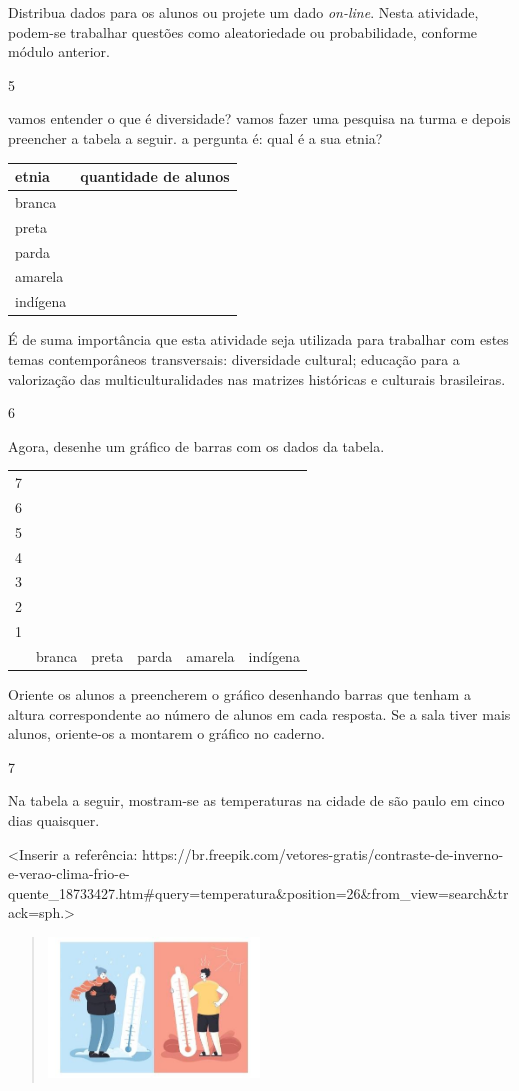 Distribua dados para os alunos ou projete um dado
\textit{on-line}. Nesta atividade, podem-se trabalhar questões como
aleatoriedade ou probabilidade, conforme módulo anterior.

\num{5}

vamos entender o que é diversidade? vamos fazer uma pesquisa na turma e
depois preencher a tabela a seguir. a pergunta é: qual é a sua etnia?

\begin{longtable}[]{@{}ll@{}}
\toprule
etnia & quantidade de alunos\tabularnewline
\midrule
\endhead
branca &\tabularnewline
preta &\tabularnewline
parda &\tabularnewline
amarela &\tabularnewline
indígena &\tabularnewline
\bottomrule
\end{longtable}

É de suma importância que esta atividade seja utilizada para trabalhar com estes temas contemporâneos transversais: diversidade cultural; educação para a valorização das
multiculturalidades nas matrizes históricas e culturais brasileiras.

\num{6}

Agora, desenhe um gráfico de barras com os dados da tabela.

\begin{longtable}[]{@{}llllll@{}}
\toprule
7 & & & & &\tabularnewline
6 & & & & &\tabularnewline
5 & & & & &\tabularnewline
4 & & & & &\tabularnewline
3 & & & & &\tabularnewline
2 & & & & &\tabularnewline
1 & & & & &\tabularnewline
& branca & preta & parda & amarela & indígena\tabularnewline
\bottomrule
\end{longtable}

Oriente os alunos a preencherem o gráfico desenhando
barras que tenham a altura correspondente ao número de alunos em cada resposta.
Se a sala tiver mais alunos, oriente-os a montarem o gráfico no caderno.

\num{7}

Na tabela a seguir, mostram-se as temperaturas na cidade de são paulo em cinco
dias quaisquer.

\textless{}Inserir a referência:
https://br.freepik.com/vetores-gratis/contraste-de-inverno-e-verao-clima-frio-e-quente\_18733427.htm\#query=temperatura\&position=26\&from\_view=search\&track=sph.\textgreater{}

\begin{quote}
\includegraphics[width=2.20878in,height=1.47139in]{media/image104.jpg}
\end{quote}

